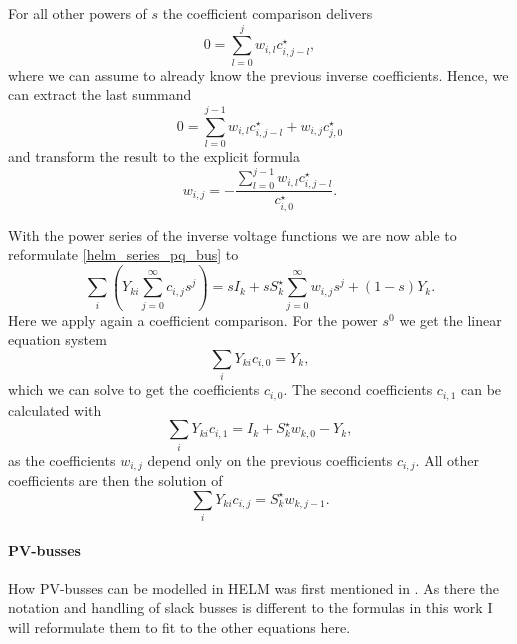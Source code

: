 For all other powers of $s$ the coefficient comparison delivers
\begin{equation}
	0 = \sum_{l = 0}^j w_{i,l} c_{i,j - l}^\star,
\end{equation}
where we can assume to already know the previous inverse coefficients. Hence, we can extract the last summand
\begin{equation}
	0 = \sum_{l = 0}^{j - 1} w_{i,l} c_{i,j - l}^\star + w_{i,j} c_{j,0}^\star
\end{equation}
and transform the result to the explicit formula 
\begin{equation}
	w_{i,j} = - \frac{\sum_{l = 0}^{j - 1} w_{i,l} c_{i,j - l}^\star}{c_{i,0}^\star}.
\end{equation}

With the power series of the inverse voltage functions we are now able to reformulate \eqref{helm_series_pq_bus} to
\begin{equation}
	\sum_i \left( Y_{ki} \sum_{j = 0}^\infty c_{i,j} s^j \right) = s I_k + s S_k^\star \sum_{j = 0}^\infty w_{i,j} s^j + (1 - s) Y_k.
\end{equation}
Here we apply again a coefficient comparison. For the power $s^0$ we get the linear equation system
\begin{equation}
	\sum_i Y_{ki} c_{i,0} = Y_k,
	\label{eq:helm_first_coefficients}
\end{equation}
which we can solve to get the coefficients $c_{i,0}$. The second coefficients $c_{i,1}$ can be calculated with
\begin{equation}
	\sum_i Y_{ki} c_{i,1} = I_k + S_k^\star w_{k,0} - Y_k,
	\label{eq:helm_second_coefficients}
\end{equation}
as the coefficients $w_{i,j}$ depend only on the previous coefficients $c_{i,j}$. All other coefficients are then the solution of
\begin{equation}
	\sum_i Y_{ki} c_{i,j} = S_k^\star w_{k,j - 1}.
	\label{eq:helm_other_coefficients}
\end{equation}

\paragraph{PV-busses}

How PV-busses can be modelled in HELM was first mentioned in \citep{helmPV}. As there the notation and handling of slack busses is different to the formulas in this work I will reformulate them to fit to the other equations here.

